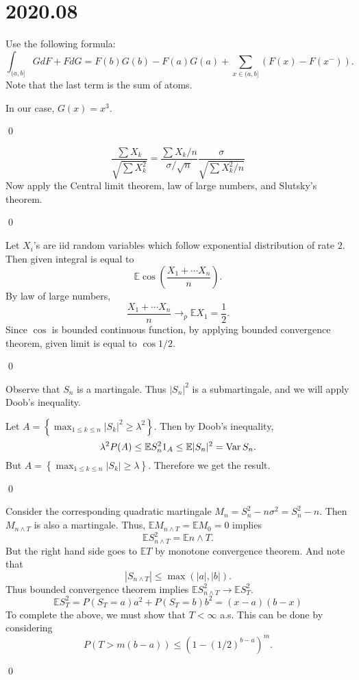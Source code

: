 \section{2020.08}

\begin{problem}
	Use the following formula:
	\[
		\int_{(a, b]}G dF+F dG = F(b)G(b)-F(a)G(a) + \sum_{x \in (a, b]}\left( F(x) - F(x^-) \right).
	\]
	Note that the last term is the sum of atoms.

	In our case, $G(x) = x^3$.

	\qed
\end{problem}

\begin{problem}
	\[
		\frac{\sum X_k}{\sqrt{\sum X_k^2}} = \frac{\sum X_k / n}{\sigma / \sqrt{n}} \frac{\sigma}{\sqrt{\sum X_k^2 /n}}
	\]
	Now apply the Central limit theorem, law of large numbers, and Slutsky's theorem.

	\qed
\end{problem}

\begin{problem}
	Let $X_i$'s are iid random variables which follow exponential distribution of rate $2$.
	Then given integral is equal to
	\[
		\mathbb{E}\cos\left( \frac{X_1 + \cdots X_n}{n} \right).
	\]
	By law of large numbers,
	\[
		\frac{X_1 + \cdots X_n}{n} \rightarrow _p \mathbb{E}X_1 = \frac{1}{2}.
	\]
	Since $\cos$ is bounded continuous function, by applying bounded convergence theorem, given limit is equal to $\cos1/2$.

	\qed
\end{problem}

\begin{problem}
	Observe that $S_n$ is a martingale.
	Thus $|S_n|^2$ is a submartingale, and we will apply Doob's inequality.

	Let $A = \left\{ \max_{1 \leq k \leq n}|S_k|^2 \geq \lambda^2 \right\}$.
	Then by Doob's inequality,
	\[
		\lambda^2 P(A) \leq \mathbb{E}S_n^2 1_{A} \leq \mathbb{E}|S_n|^2 = \operatorname{Var}{S_n}.
	\]
	But $A = \left\{ \max_{1\leq k\leq n}|S_k| \geq \lambda \right\}$.
	Therefore we get the result.

	\qed
\end{problem}

\begin{problem}
	Consider the corresponding quadratic martingale $M_n = S_n^2 - n\sigma^2 = S_n^2 -n$.
	Then $M_{n\wedge T}$ is also a martingale.
	Thus, $\mathbb{E} M_{n\wedge T} = \mathbb{E}M_0 = 0$ implies
	\[
		\mathbb{E} S_{n\wedge T}^2 = \mathbb{E} n\wedge T.
	\]
	But the right hand side goes to $\mathbb{E} T$ by monotone convergence theorem.
	And note that
	\[
		| S_{n\wedge T} | \leq \max( |a|, |b| ).
	\]
	Thus bounded convergence theorem implies $\mathbb{E} S_{n\wedge T}^2 \rightarrow \mathbb{E}S_T^2$. 
	\[
		\mathbb{E} S_T^2 = P(S_T = a) a^2 + P(S_T = b) b^2 = (x-a)(b-x)
	\]
	To complete the above, we must show that $T<\infty$ a.s.
	This can be done by considering
	\[
		P\left( T > m(b-a) \right) \leq \left( 1- \left( 1/2 \right)^{b-a} \right)^m.
	\]

	\qed
\end{problem}
